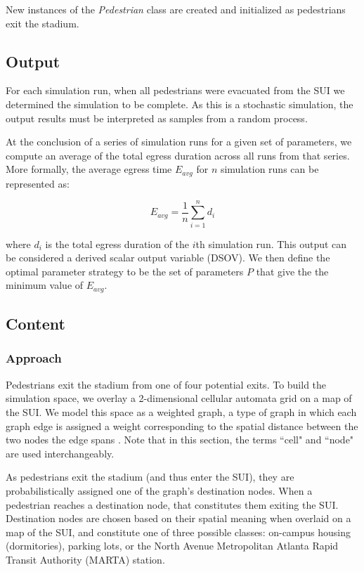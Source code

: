 \documentclass[12pt]{article}
\begin{document}
New instances of the \textit{Pedestrian} class are created and initialized
as pedestrians exit the stadium.

\subsection{Output}
For each simulation run, when all pedestrians were evacuated from the SUI we
determined the simulation to be complete. As this is a stochastic simulation,
the output results must be interpreted as samples from a random process.

At the conclusion of a series of simulation runs for a given set of parameters,
we compute an average of the total egress duration across all runs from that
series. More formally, the average egress time $E_{avg}$ for $n$ simulation runs
can be represented as:

\begin{equation}
E_{avg} = \frac{1}{n}\sum\limits_{i=1}^n d_i
\end{equation}

where $d_i$ is the total egress duration of the $i$th simulation run. This
output can be considered a derived scalar output variable (DSOV). We then
define the optimal parameter strategy to be the set of parameters $P$ that
give the the minimum value of $E_{avg}$.

\subsection{Content}

\subsubsection{Approach}
Pedestrians exit the stadium from one of four potential exits. To build the
simulation space, we overlay a 2-dimensional cellular automata grid on a map of
the SUI. We model this space as a weighted graph, a type of graph in which each
graph edge is assigned a weight corresponding to the spatial distance between
the two nodes the edge spans \cite{west2001introduction}. Note that in this
section, the terms ``cell" and ``node" are used interchangeably.

As pedestrians exit the stadium (and thus enter the SUI), they are
probabilistically assigned one of the graph’s destination nodes.  When a
pedestrian reaches a destination node, that constitutes them exiting the SUI.
Destination nodes are chosen based on their spatial meaning when overlaid on a
map of the SUI, and constitute one of three possible classes: on-campus housing
(dormitories), parking lots, or the North Avenue Metropolitan Atlanta Rapid
Transit Authority (MARTA) station.
\end{document}
